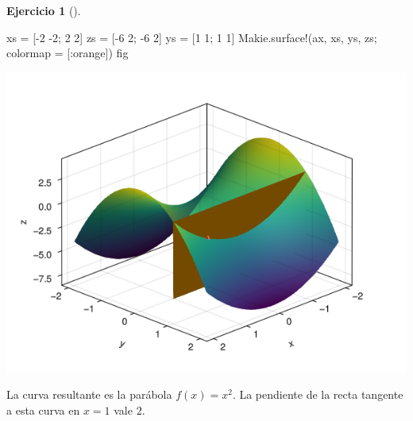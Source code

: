 \documentclass[
  a4paper,
]{scrreport}
\newenvironment{Shaded}{\begin{snugshade}}{\end{snugshade}}
\newcommand{\FloatTok}[1]{\textcolor[rgb]{0.68,0.00,0.00}{#1}}
\newcommand{\FunctionTok}[1]{\textcolor[rgb]{0.28,0.35,0.67}{#1}}
\newcommand{\NormalTok}[1]{\textcolor[rgb]{0.00,0.23,0.31}{#1}}
\newcommand{\OperatorTok}[1]{\textcolor[rgb]{0.37,0.37,0.37}{#1}}
\theoremstyle{definition}
\newtheorem{exercise}{Ejercicio}[chapter]
\theoremstyle{remark}
\begin{document}
\begin{exercise}[]
\begin{enumerate}
  \begin{tcolorbox}[enhanced jigsaw, bottomtitle=1mm, rightrule=.15mm, left=2mm, colback=white, title=\textcolor{quarto-callout-tip-color}{\faLightbulb}\hspace{0.5em}{Solución}, bottomrule=.15mm, colframe=quarto-callout-tip-color-frame, toprule=.15mm, leftrule=.75mm, opacityback=0, coltitle=black, breakable, colbacktitle=quarto-callout-tip-color!10!white, arc=.35mm, toptitle=1mm, titlerule=0mm, opacitybacktitle=0.6]

\begin{Shaded}
\begin{Highlighting}[]
\NormalTok{xs }\OperatorTok{=}\NormalTok{ [}\OperatorTok{{-}}\FloatTok{2} \OperatorTok{{-}}\FloatTok{2}\NormalTok{; }\FloatTok{2} \FloatTok{2}\NormalTok{]}
\NormalTok{zs }\OperatorTok{=}\NormalTok{ [}\OperatorTok{{-}}\FloatTok{6} \FloatTok{2}\NormalTok{; }\OperatorTok{{-}}\FloatTok{6} \FloatTok{2}\NormalTok{]}
\NormalTok{ys }\OperatorTok{=}\NormalTok{ [}\FloatTok{1} \FloatTok{1}\NormalTok{; }\FloatTok{1} \FloatTok{1}\NormalTok{]}
\NormalTok{Makie.}\FunctionTok{surface!}\NormalTok{(ax, xs, ys, zs; colormap }\OperatorTok{=}\NormalTok{ [}\OperatorTok{:}\NormalTok{orange])}
\NormalTok{fig}
\end{Highlighting}
\end{Shaded}

  \includegraphics{09-derivadas-funciones-varias-variables_files/figure-pdf/cell-17-output-1.png}

  La curva resultante es la parábola \(f(x) = x^2\). La pendiente de la
  recta tangente a esta curva en \(x=1\) vale \(2\).


\end{tcolorbox}
\end{enumerate}
\end{exercise}
\end{document}
